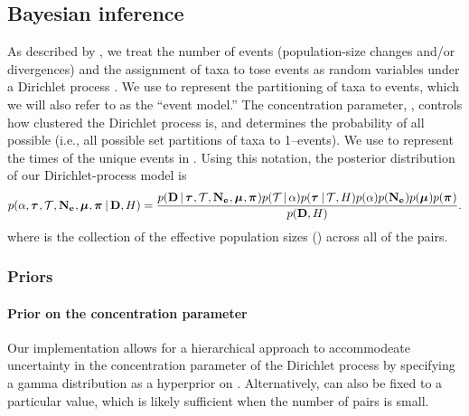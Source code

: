 \subsection{Bayesian inference}

\begin{linenomath}
As described by \citet{Oaks2018ecoevolity},
we treat the number of events (population-size changes and/or divergences)
and the assignment of taxa to tose events as
random variables under a Dirichlet process \citep{Ferguson1973,
    Antoniak1974}.
We use \etimesets to represent the partitioning of taxa to events,
which we will also refer to as the ``event model.''
The concentration parameter, \concentration, controls how clustered the
Dirichlet process is, and determines the probability of all possible \etimesets
(i.e., all possible set partitions of taxa to 1--\ncomparisons events).
We use \etimes to represent the times of the unique events in \etimesets.
Using this notation, the posterior distribution of our 
Dirichlet-process model is
\begin{equation}
    p(
    \alpha,
    \boldsymbol{\tau}_{},
    \mathcal{T},
    \mathbf{N_{e}}_{},
    \boldsymbol{\mu}_{},
    \boldsymbol{\pi}_{}
    \,|\,
    \mathbf{D},
    H
    )
    =
    \frac{
        p(
        \mathbf{D}
        \,|\,
        \boldsymbol{\tau}_{},
        \mathcal{T},
        \mathbf{N_{e}}_{},
        \boldsymbol{\mu}_{},
        \boldsymbol{\pi}_{}
        )
        p(\mathcal{T} \,|\, \alpha)
        p(\boldsymbol{\tau}_{} \,|\, \mathcal{T}, H)
        p(\alpha)
        p(\mathbf{N_{e}}_{})
        p(\boldsymbol{\mu}_{})
        p(\boldsymbol{\pi}_{})
    }{
        p(
        \mathbf{D},
        H
        )
    }.
    \label{eq:bayesruleexpanded}
\end{equation}
where
\collectionpopsizes
is the collection of the effective population sizes (\comparisonpopsizes{})
across all of the pairs.
\end{linenomath}

\subsubsection{Priors}

\paragraph{Prior on the concentration parameter}
Our implementation allows for a hierarchical approach to accommodeate
uncertainty in the concentration parameter of the Dirichlet process
by specifying a gamma distribution as a hyperprior on
\concentration \citep{Escobar1995,Heath2011}.
Alternatively, \concentration can also be fixed to a particular value,
which is likely sufficient when the number of pairs is small.

